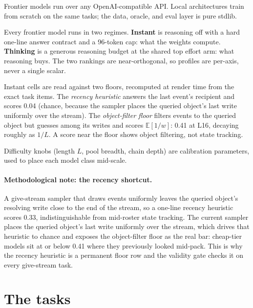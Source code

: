 \documentclass[11pt]{article}
\begin{document}
Frontier models run over any OpenAI-compatible API. Local architectures train from scratch on
the same tasks; the data, oracle, and eval layer is pure stdlib.

Every frontier model runs in two regimes. \textbf{Instant} is reasoning off with a hard
one-line answer contract and a 96-token cap: what the weights compute. \textbf{Thinking} is a
generous reasoning budget at the shared top effort arm: what reasoning buys. The two rankings
are near-orthogonal, so profiles are per-axis, never a single scalar.

Instant cells are read against two floors, recomputed at render time from the exact task
items. The \emph{recency heuristic} answers the last event's recipient and scores 0.04
(chance, because the sampler places the queried object's last write uniformly over the
stream). The \emph{object-filter floor} filters events to the queried object but guesses among
its writes and scores $\mathbb{E}[1/w]$: 0.41 at L16, decaying roughly as $1/L$. A score near
the floor shows object filtering, not state tracking.

Difficulty knobs (length $L$, pool breadth, chain depth) are calibration parameters, used to
place each model class mid-scale.

\paragraph{Methodological note: the recency shortcut.} A give-stream sampler that draws events
uniformly leaves the queried object's resolving write close to the end of the stream, so a
one-line recency heuristic scores 0.33, indistinguishable from mid-roster state tracking. The
current sampler places the queried object's last write uniformly over the stream, which drives
that heuristic to chance and exposes the object-filter floor as the real bar: cheap-tier
models sit at or below 0.41 where they previously looked mid-pack. This is why the recency
heuristic is a permanent floor row and the validity gate checks it on every give-stream task.

\section{The tasks}
\end{document}
